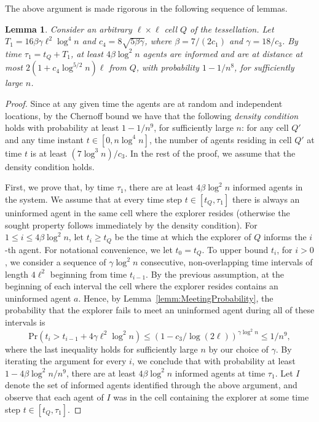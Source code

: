 \documentclass[11pt]{article}
\newcommand{\prob}[1]{\mathrm{Pr}\left({#1}\right)}
\newtheorem{lemm}{Lemma}
\begin{document}
The above argument is made rigorous in the following sequence of
lemmas.
\begin{lemm}
\label{lemm:FirstPhase}
Consider an arbitrary $\ell \times \ell$ cell $Q$ of the tessellation.
Let $T_1 = 16 \beta \gamma \ell^2 \log^4 n$ and
$c_4 = 8\sqrt{5\beta\gamma}$,
where $\beta = 7/(2c_1)$ and $\gamma = 18/c_3$.
By time $\tau_1 = t_Q + T_1$, at least $4\beta \log^2 n$ agents are informed and are
at distance at most $2 (1 + c_4 \log^{5/2} n) \ell$ from $Q$,
with probability $1-{1/n^8}$, for sufficiently large $n$.
\end{lemm}
\begin{proof}
Since at any given time the agents are at random and independent
locations, by the Chernoff bound we have that the following
\emph{density condition} holds with probability at least $1-1/n^9$,
for sufficiently large $n$:
for any cell $Q'$ and any time instant $t \in [0, n\log^4 n]$,
the number of agents residing in cell $Q'$ at time $t$
is at least $(7 \log^3 n)/{c_3}$.
In the rest of the proof, we assume that the density condition holds.

First, we prove that, by time $\tau_1$, there are at least $4\beta
\log^2 n$ informed agents in the system. We assume that at every time
step $t \in [t_Q,\tau_1]$ there is always an uninformed agent in the
same cell where the explorer resides (otherwise the sought property
follows immediately by the density condition). For $1 \leq i \leq
4\beta \log^2 n$, let $t_i \geq t_Q$ be the time at which the explorer
of $Q$ informs the $i$-th agent.  For notational convenience, we let
$t_0 = t_Q$.  To upper bound $t_i$, for $i > 0$, we consider a
sequence of $\gamma \log^2 n$ consecutive, non-overlapping time
intervals of length $4 \ell^2$ beginning from time $t_{i-1}$.  By the
previous assumption, at the beginning of each interval the cell where
the explorer resides contains an uninformed agent $a$.  Hence, by
Lemma~\ref{lemm:MeetingProbability}, the probability that the explorer
fails to meet an uninformed agent during all of these intervals is
\[
	\prob{t_i >  t_{i-1} + 4\gamma \ell^2 \log^2 n}
		\leq \left(1-c_3/\log(2\ell)\right)^{\gamma \log^2 n}
		\leq 1/n^9,
\]
where the last inequality holds for sufficiently large $n$
by our choice of $\gamma$.
By iterating the argument
for every $i$, we conclude that with probability at least $1 - 4\beta \log^2 n/n^9$,
there are at least $4\beta \log^2 n$ informed agents at time
$\tau_1$.  Let $I$ denote the set of informed agents identified
through the above argument, and observe that each agent of $I$ was in
the cell containing the explorer at some time step $t \in [t_Q, \tau_1]$.


\end{proof}
\end{document}
